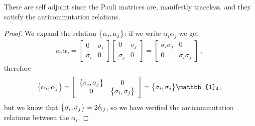 \documentclass[main.tex]{subfiles}
\begin{document}
These are self adjoint since the Pauli matrices are, manifestly traceless, and they satisfy the anticommutation relations. 

\begin{proof}
We expand the relation \(\qty{\alpha_{i}, \alpha_{j}}\): if we write \(\alpha_{i} \alpha_{j}\) we get 
%
\begin{subequations}
\begin{align}
\alpha_{i} \alpha_{j} = 
\left[\begin{array}{cc}
0 & \sigma_{i} \\ 
\sigma_{i} & 0
\end{array}\right]
\left[\begin{array}{cc}
0 & \sigma_{j} \\ 
\sigma_{j} & 0
\end{array}\right]
= \left[\begin{array}{cc}
\sigma_{i} \sigma_{j} & 0 \\ 
0 & \sigma_{i} \sigma_{j}
\end{array}\right]
\,,
\end{align}
\end{subequations}
%
therefore 
%
\begin{subequations}
\begin{align}
\qty{\alpha_{i}, \alpha_{j}} = \left[\begin{array}{cc}
\qty{\sigma_{i}, \sigma_{j}} & 0 \\ 
0 & \qty{\sigma_{i}, \sigma_{j}}
\end{array}\right]
= \qty{\sigma_{i}, \sigma_{j}} \mathbb{1}_{4}
\,,
\end{align}
\end{subequations}
%
but we know that \(\qty{\sigma_{i}, \sigma_{j}} = 2 \delta_{ij}\), so we have verified the anticommutation relations between the \(\alpha_{i}\). 


\end{proof}
\end{document}
